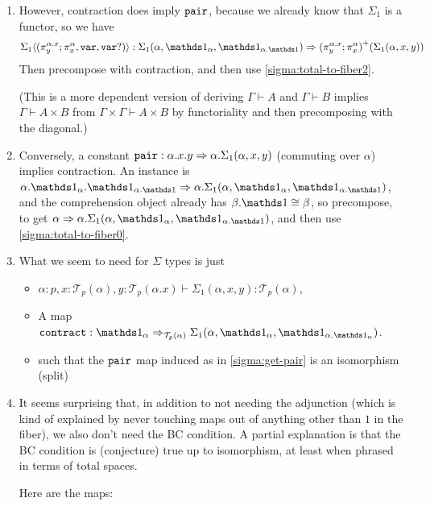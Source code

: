\documentclass[10pt]{article}
\theoremstyle{definition}
\newcommand{\tcell}{\Rightarrow}
\newcommand\TrPlus[2]{\ensuremath{{#1}^+(#2)}}
\newcommand\El[2]{\mathcal{T}_{#1}(#2)}
\newcommand\ap[2]{\ensuremath{#1 \langle #2 \rangle }}
\begin{document}
\begin{enumerate}
\item \label{sigma:get-pair} However, contraction does imply
  $\mathtt{pair}$, because we already know that $\Sigma_1$ is a functor, so
  we have
  \[
  \ap{\Sigma_1}{(\pi^{\alpha.x}_y;\pi^\alpha_x, \mtt{var}, \mtt{var}?)} :
  \Sigma_1(\alpha,\One_\alpha,\One_{\alpha.\One}) \tcell \TrPlus{(\pi^{\alpha.x}_y;\pi^\alpha_x)}{\Sigma_1(\alpha,x,y)}
  \]
  Then precompose with contraction, and then use
  \ref{sigma:total-to-fiber2}.

  (This is a more dependent version of deriving $\Gamma \vdash A$ and
  $\Gamma \vdash B$ implies $\Gamma \vdash A \times B$ from $\Gamma
  \times \Gamma \vdash A \times B$ by functoriality and then
  precomposing with the diagonal.)
  
\item Conversely, a constant $\mtt{pair} : \alpha.x.y \tcell
  \alpha.\Sigma_1(\alpha,x,y)$ (commuting over $\alpha$) implies
  contraction. An instance is $\alpha.\One_{\alpha}.\One_{\alpha.\One} \tcell
  \alpha.\Sigma_1(\alpha,\One_\alpha,\One_{\alpha.\One})$, and the comprehension
  object already has $\beta.\One \cong \beta$, so precompose, to get
  $\alpha \tcell \alpha.\Sigma_1(\alpha,\One_\alpha,\One_{\alpha.\One})$, and
  then use \ref{sigma:total-to-fiber0}.

\item \label{sigma:spec} What we seem to need for $\Sigma$ types is just
  \begin{itemize}
  \item $\alpha : p, x : \El{p}{\alpha}, y : \El{p}{\alpha.x} \vdash \Sigma_1(\alpha,x,y) : \El{p}{\alpha}$,
  \item A map $\mtt{contract} : \One_\alpha \tcell_{\El{p}{\alpha}} \Sigma_1(\alpha,\One_\alpha,\One_{\alpha.{\One_\alpha}})$.
  \item such that the $\mathtt{pair}$ map induced as in
    \ref{sigma:get-pair} is an isomorphism (split)
  \end{itemize}

\item It seems surprising that, in addition to not needing the
  adjunction (which is kind of explained by never touching maps out of
  anything other than $1$ in the fiber), we also don't need the BC
  condition.  A partial explanation is that the BC condition is
  (conjecture) true up to isomorphism, at least when phrased in terms of
  total spaces.

  Here are the maps:


\end{enumerate}
\end{document}
